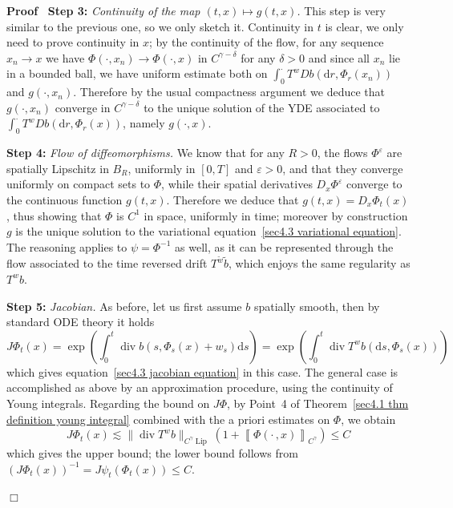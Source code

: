 \documentclass[10pt]{article}
\newcommand{\mathd}{\mathrm{d}}
\newcommand{\tmop}[1]{\ensuremath{\operatorname{#1}}}
\newcommand{\tmstrong}[1]{\textbf{#1}}
\newcommand{\tmtextit}[1]{{\itshape{#1}}}
\newenvironment{proof}{\noindent\textbf{Proof\ }}{\hspace*{\fill}$\Box$\medskip}
\begin{document}
\begin{proof}
  {\tmstrong{Step 3:}} \tmtextit{Continuity of the map $(t, x) \mapsto g (t,
  x)$.} This step is very similar to the previous one, so we only sketch it.
  Continuity in $t$ is clear, we only need to prove continuity in $x$; by the
  continuity of the flow, for any sequence $x_n \rightarrow x$ we have $\Phi
  (\cdot, x_n) \rightarrow \Phi (\cdot, x)$ in $C^{\gamma - \delta}$ for any
  $\delta > 0$ and since all $x_n$ lie in a bounded ball, we have uniform
  estimate both on $\int_0^{\cdot} T^w D b (\mathd r, \Phi_r (x_n))$ and $g
  (\cdot, x_n)$. Therefore by the usual compactness argument we deduce that $g
  (\cdot, x_n)$ converge in $C^{\gamma - \delta}$ to the unique solution of
  the YDE associated to $\int_0^{\cdot} T^w D b (\mathd r, \Phi_r (x))$,
  namely $g (\cdot, x)$.
  
  {\tmstrong{Step 4:}} \tmtextit{Flow of diffeomorphisms.} We know that for
  any $R > 0$, the flows $\Phi^{\varepsilon}$ are spatially Lipschitz in
  $B_R$, uniformly in $[0, T]$ and $\varepsilon > 0$, and that they converge
  uniformly on compact sets to $\Phi$, while their spatial derivatives $D_x
  \Phi^{\varepsilon}$ converge to the continuous function $g (t, x)$.
  Therefore we deduce that $g (t, x) = D_x \Phi_t (x)$, thus showing that
  $\Phi$ is $C^1$ in space, uniformly in time; moreover by construction $g$ is
  the unique solution to the variational equation~{\eqref{sec4.3 variational
  equation}}. The reasoning applies to $\psi = \Phi^{- 1}$ as well, as it can
  be represented through the flow associated to the time reversed drift
  $T^{\tilde{w}} \tilde{b}$, which enjoys the same regularity as $T^w b$.
  
  {\tmstrong{Step 5:}} \tmtextit{Jacobian.} As before, let us first assume $b$
  spatially smooth, then by standard ODE theory it holds
  \[ J \Phi_t (x) = \exp \left( \int_0^t \tmop{div} b (s, \Phi_s (x) + w_s)
     \mathd s \right) = \exp \left( \int_0^t \tmop{div} T^w b (\mathd s,
     \Phi_s (x)) \right) \]
  which gives equation~{\eqref{sec4.3 jacobian equation}} in this case. The
  general case is accomplished as above by an approximation procedure, using
  the continuity of Young integrals. Regarding the bound on $J \Phi$, by
  Point~4 of Theorem~\ref{sec4.1 thm definition young integral} combined with
  the a priori estimates on $\Phi$, we obtain
  \[ J \Phi_t (x) \lesssim \| \tmop{div} T^w b \|_{C^{\gamma} \tmop{Lip}}
     \left( 1 + \left\llbracket \Phi \left( \cdot \,, x \right)
     \right\rrbracket_{C^{\gamma}} \right) \leqslant C \]
  which gives the upper bound; the lower bound follows from $(J \Phi_t (x))^{-
  1} = J \psi_t (\Phi_t (x)) \leqslant C$.
  

\end{proof}
\end{document}
